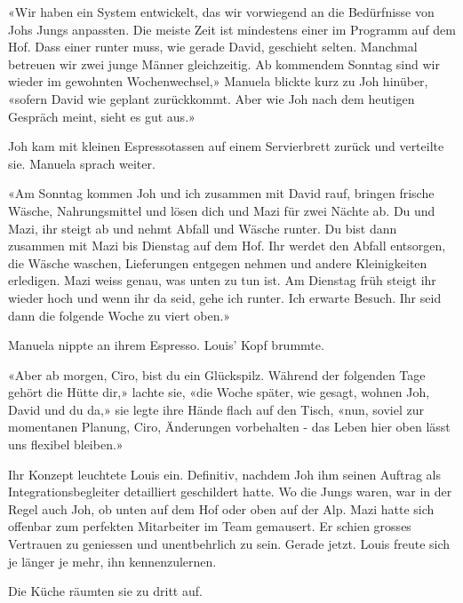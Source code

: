 «Wir haben ein System entwickelt, das wir vorwiegend an die Bedürfnisse
von Johs Jungs anpassten. Die meiste Zeit ist mindestens einer im
Programm auf dem Hof. Dass einer runter muss, wie gerade David,
geschieht selten. Manchmal betreuen wir zwei junge Männer gleichzeitig.
Ab kommendem Sonntag sind wir wieder im gewohnten Wochenwechsel,» Manuela blickte
kurz zu Joh hinüber, «sofern David wie geplant zurückkommt. Aber wie Joh
nach dem heutigen Gespräch meint, sieht es gut aus.»

Joh kam mit kleinen Espressotassen auf einem Servierbrett zurück und verteilte sie. 
Manuela sprach weiter.  

«Am Sonntag kommen Joh und ich zusammen mit David rauf, bringen frische
Wäsche, Nahrungsmittel und lösen dich und Mazi für zwei Nächte ab. Du
und Mazi, ihr steigt ab und nehmt Abfall und Wäsche runter. Du bist dann
zusammen mit Mazi bis Dienstag auf dem Hof. Ihr werdet den Abfall
entsorgen, die Wäsche waschen, Lieferungen entgegen nehmen und andere
Kleinigkeiten erledigen. Mazi weiss genau, was unten zu tun ist. Am
Dienstag früh steigt ihr wieder hoch und wenn ihr da seid, gehe ich
runter. Ich erwarte Besuch. Ihr seid dann die folgende Woche zu viert
oben.»

Manuela nippte an ihrem Espresso. Louis’ Kopf brummte.

«Aber ab morgen, Ciro, bist du ein Glückspilz. Während
der folgenden Tage gehört die Hütte dir,» lachte sie, «die Woche später, wie
gesagt, wohnen Joh, David und du da,» sie legte ihre Hände flach auf den Tisch, «nun, soviel zur  momentanen Planung, Ciro, Änderungen vorbehalten - das Leben hier oben lässt uns flexibel bleiben.»

Ihr Konzept leuchtete Louis ein. Definitiv, nachdem Joh ihm seinen
Auftrag als Integrationsbegleiter detailliert geschildert hatte. Wo die
Jungs waren, war in der Regel auch Joh, ob unten auf dem Hof oder oben
auf der Alp. Mazi hatte sich offenbar zum perfekten Mitarbeiter im Team
gemausert. Er schien grosses Vertrauen zu geniessen und unentbehrlich zu
sein. Gerade jetzt. Louis freute sich je länger je mehr, ihn
kennenzulernen.

Die Küche räumten sie zu dritt auf.
